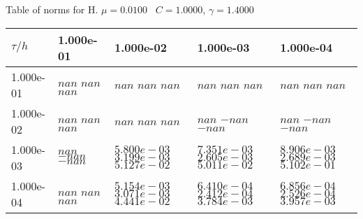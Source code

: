 \begin{center}
Table of norms for H. $\mu = 0.0100$ \, $C = 1.0000$, $\gamma = 1.4000$
  
\begin{tabular}{|p{1in}|p{1in}|p{1in}|p{1in}|p{1in}|} \hline
$\tau / h$ &1.000e-01 &1.000e-02 &1.000e-03 &1.000e-04 \\ \hline 
1.000e-01 & $nan$  $nan$  $nan$  & $nan$  $nan$  $nan$  & $nan$  $nan$  $nan$  & $nan$  $nan$  $nan$  \\ \hline 
1.000e-02 & $nan$  $nan$  $nan$  & $nan$  $nan$  $nan$  & $nan$  $-nan$  $-nan$  & $nan$  $-nan$  $-nan$  \\ \hline 
1.000e-03 & $nan$  $-nan$  $-nan$  & $5.800e-03$  $3.199e-03$  $5.127e-02$  & $7.351e-03$  $2.605e-03$  $5.011e-02$  & $8.906e-03$  $2.689e-03$  $5.102e-01$  \\ \hline 
1.000e-04 & $nan$  $nan$  $nan$  & $5.154e-03$  $3.071e-03$  $4.441e-02$  & $6.410e-04$  $2.412e-04$  $3.784e-03$  & $6.856e-04$  $2.526e-04$  $3.957e-03$  \\ \hline 

\end{tabular}\\[20pt]
\end{center}
